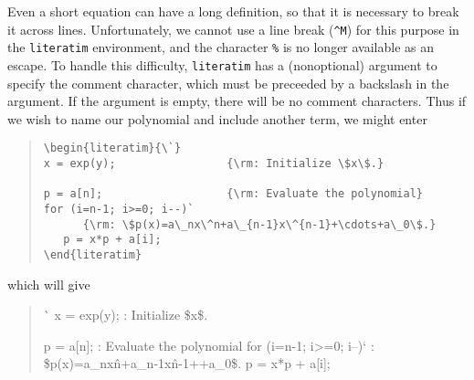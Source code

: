 Even a short equation can have a long definition, so that it is
necessary to break it across lines.  Unfortunately, we cannot use a
line break (\verb|^M|) for this purpose in the \verb|literatim|
environment, and the character \verb|%| is no longer available as an
escape.  To handle this difficulty, \verb|literatim| has a
(nonoptional) argument to specify the comment character, which must
be preceeded by a backslash in the argument.  If the argument is
empty, there will be no comment characters.  Thus if we wish to name
our polynomial and include another term, we might enter
\begin{quote}
\small
\begin{verbatim}
\begin{literatim}{\`}
x = exp(y);                 {\rm: Initialize \$x\$.}

p = a[n];                   {\rm: Evaluate the polynomial}
for (i=n-1; i>=0; i--)`
      {\rm: \$p(x)=a\_nx\^n+a\_{n-1}x\^{n-1}+\cdots+a\_0\$.} 
   p = x*p + a[i];
\end{literatim}
\end{verbatim}
\end{quote}
which will give
\begin{quote}
\begin{literatim}{\`}
x = exp(y);                 {\rm: Initialize \$x\$.}

p = a[n];                   {\rm: Evaluate the polynomial}
for (i=n-1; i>=0; i--)`
      {\rm: \$p(x)=a\_nx\^n+a\_{n-1}x\^{n-1}+\cdots+a\_0\$.} 
   p = x*p + a[i];
\end{literatim}
\end{quote}


